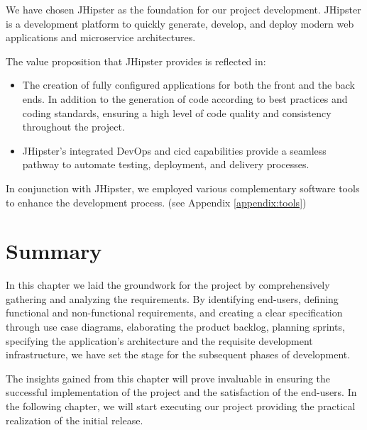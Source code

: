 We have chosen JHipster as the foundation for our project development. JHipster is a development
platform to quickly generate, develop, and deploy modern web applications and microservice
architectures. \cite{jhipster}

\noindent The value proposition that JHipster provides is reflected in:

\begin{itemize}
      \item The creation of fully configured applications for both the front and the back ends.
            In addition to the generation of code according to best practices and coding standards,
            ensuring a high level of code quality and consistency throughout the project.
      \item JHipster's integrated DevOps and \acrshort{cicd} capabilities provide a seamless pathway to automate
            testing, deployment, and delivery processes.
\end{itemize}

\noindent In conjunction with JHipster, we employed various complementary software tools to enhance
the development process. (see Appendix \ref{appendix:tools})

\section*{Summary}
In this chapter we laid the groundwork for the project by comprehensively gathering and analyzing
the requirements. By identifying end-users, defining functional and non-functional requirements,
and creating a clear specification through use case diagrams, elaborating the product backlog, planning
sprints, specifying the application's architecture and the requisite development infrastructure, we have
set the stage for the subsequent phases of development.

The insights gained from this chapter will prove invaluable in ensuring the successful implementation
of the project and the satisfaction of the end-users. In the following chapter, we will start executing
our project providing the practical realization of the initial release.
